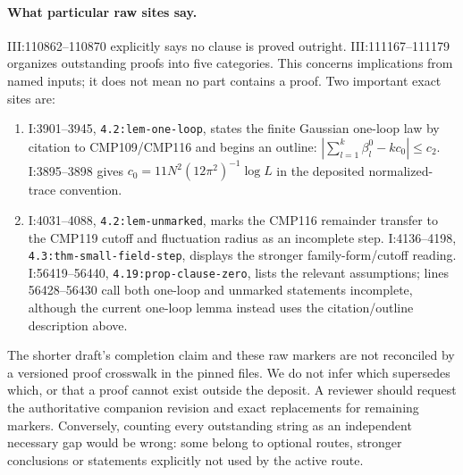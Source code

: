 \documentclass[11pt]{article}
\providecommand{\hrbpath}[1]{\nolinkurl{#1}}
\theoremstyle{remark}
\begin{document}
\paragraph{What particular raw sites say.}
III:110862--110870 explicitly says no clause is proved
outright. III:111167--111179 organizes outstanding proofs
into five categories. This concerns implications from
named inputs; it does not mean no part contains a proof.
Two important exact sites are:
\begin{enumerate}
\item I:3901--3945, \hrbpath{4.2:lem-one-loop}, states
the finite Gaussian one-loop law by citation to
CMP109/CMP116 and begins an outline:
\(\left|\sum_{l=1}^k\beta_l^0-kc_0\right|\leq c_2\).
I:3895--3898 gives \(c_0=11N^2(12\pi^2)^{-1}\log L\)
in the deposited normalized-trace convention.
\item I:4031--4088, \hrbpath{4.2:lem-unmarked}, marks
the CMP116 remainder transfer to the CMP119 cutoff
and fluctuation radius as an incomplete step.
I:4136--4198, \hrbpath{4.3:thm-small-field-step},
displays the stronger family-form/cutoff reading.
I:56419--56440, \hrbpath{4.19:prop-clause-zero},
lists the relevant assumptions; lines 56428--56430
call both one-loop and unmarked statements incomplete,
although the current one-loop lemma instead uses
the citation/outline description above.
\end{enumerate}

The shorter draft's completion claim and these raw
markers are not reconciled by a versioned proof
crosswalk in the pinned files. We do not infer which
supersedes which, or that a proof cannot exist outside
the deposit. A reviewer should request the authoritative
companion revision and exact replacements for remaining
markers. Conversely, counting every outstanding string
as an independent necessary gap would be wrong: some
belong to optional routes, stronger conclusions or
statements explicitly not used by the active route.
\end{document}
